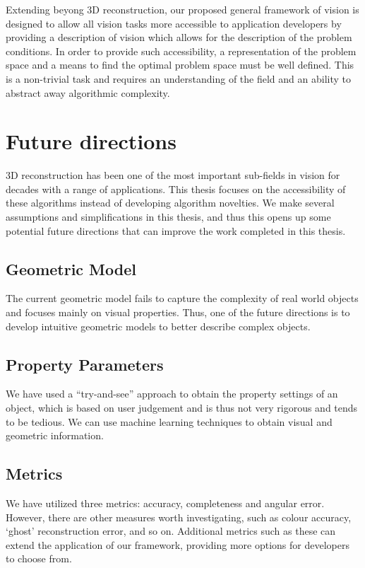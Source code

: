 Extending beyong 3D reconstruction, our proposed general framework of vision is designed to allow all vision tasks more accessible to application developers by providing a description of vision which allows for the description of the problem conditions. In order to provide such accessibility, a representation of the problem space and a means to find the optimal problem space must be well defined. This is a non-trivial task and requires an understanding of the field and an ability to abstract away algorithmic complexity.

\section{Future directions}
3D reconstruction has been one of the most important sub-fields in vision for decades with a range of applications. This thesis focuses on the accessibility of these algorithms instead of developing algorithm novelties. We make several assumptions and simplifications in this thesis, and thus this opens up some potential future directions that can improve the work completed in this thesis.

\subsection{Geometric Model}
The current geometric model fails to capture the complexity of real world objects and focuses mainly on visual properties. Thus, one of the future directions is to develop intuitive geometric models to better describe complex objects.

\subsection{Property Parameters}
We have used a ``try-and-see'' approach to obtain the property settings of an object, which is based on user judgement and is thus not very rigorous and tends to be tedious. We can use machine learning techniques to obtain visual and geometric information.

\subsection{Metrics}
We have utilized three metrics: accuracy, completeness and angular error. However, there are other measures worth investigating, such as colour accuracy, `ghost' reconstruction error, and so on. Additional metrics such as these can extend the application of our framework, providing more options for developers to choose from.

